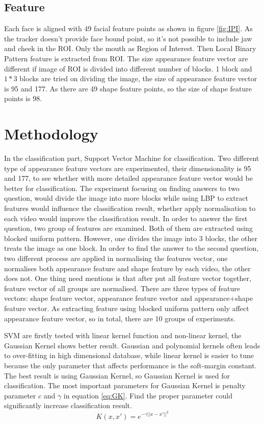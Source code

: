 \subsection{Feature}
Each face is aligned with 49 facial feature points as shown in figure \ref{fig:IPI}. As the tracker doesn't provide face bound point, so it's not possible to include jaw and cheek in the ROI.  Only the mouth as Region of Interest. Then Local Binary Pattern feature is extracted from ROI. The size appearance feature vector are different if image of ROI is divided into different number of blocks. 1 block and $1*3$ blocks are tried on dividing the image, the size of appearance feature vector is 95 and 177. As there are 49 shape feature points, so the size of shape feature points is 98.
\section{Methodology}
In the classification part, Support Vector Machine for classification. Two different type of appearance feature vectors are experimented, their dimensionality is 95 and 177, to see whether with more detailed appearance feature vector would be better for classification. The experiment focusing on finding answers to two question, would divide the image into more blocks while using LBP to extract features would influence the classification result, whether apply normalisation to each video would improve the classification result. In order to answer the first question, two group of features are examined. Both of them are extracted using blocked uniform pattern. However, one divides the image into 3 blocks, the other treats the image as one block. In order to find the answer to the second question, two different process are applied in normalising the features vector, one normalises both appearance feature and shape feature by each video, the other does not. One thing need mentions is that after put all feature vector together, feature vector of all groups are normalised. There are three types of feature vectors: shape feature vector, appearance feature vector and appearance+shape feature vector. As extracting feature using blocked uniform pattern only affect appearance feature vector, so in total, there are 10 groups of experiments.

SVM are firstly tested with linear kernel function and non-linear kernel, the Gaussian Kernel shows better result. Gaussian and polynomial kernels often leads to over-fitting in high dimensional database, while linear kernel is easier to tune because the only parameter that affects performance is the soft-margin constant\cite{ben2010user}. The best result is using Gaussian Kernel, so Gaussian Kernel is used for classification. The most important parameters for Gaussian Kernel is  penalty parameter $c$ and $\gamma$ in equation \ref{eq:GK}. Find the proper parameter could significantly increase classification result.\begin{equation}
K(x,x') = e^{-\gamma||x-x'||^{2}}
\label{eq:GK}
\end{equation}

